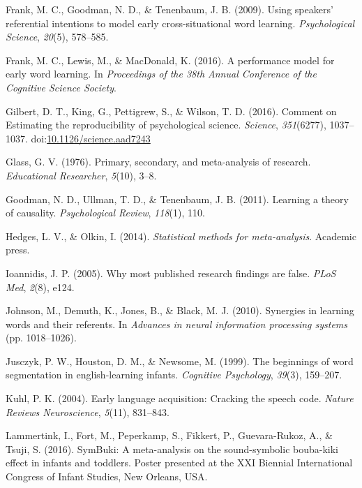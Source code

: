 \documentclass[english,floatsintext,man]{apa6}
\begin{document}
\hypertarget{ref-frank2009using}{}
Frank, M. C., Goodman, N. D., \& Tenenbaum, J. B. (2009). Using
speakers' referential intentions to model early cross-situational word
learning. \emph{Psychological Science}, \emph{20}(5), 578--585.

\hypertarget{ref-frank2016performance}{}
Frank, M. C., Lewis, M., \& MacDonald, K. (2016). A performance model
for early word learning. In \emph{Proceedings of the 38th Annual
Conference of the Cognitive Science Society}.

\hypertarget{ref-Gilbert1037}{}
Gilbert, D. T., King, G., Pettigrew, S., \& Wilson, T. D. (2016).
Comment on Estimating the reproducibility of psychological science.
\emph{Science}, \emph{351}(6277), 1037--1037.
doi:\href{https://doi.org/10.1126/science.aad7243}{10.1126/science.aad7243}

\hypertarget{ref-glass1976primary}{}
Glass, G. V. (1976). Primary, secondary, and meta-analysis of research.
\emph{Educational Researcher}, \emph{5}(10), 3--8.

\hypertarget{ref-goodman2011learning}{}
Goodman, N. D., Ullman, T. D., \& Tenenbaum, J. B. (2011). Learning a
theory of causality. \emph{Psychological Review}, \emph{118}(1), 110.

\hypertarget{ref-hedges2014statistical}{}
Hedges, L. V., \& Olkin, I. (2014). \emph{Statistical methods for
meta-analysis}. Academic press.

\hypertarget{ref-ioannidis2005most}{}
Ioannidis, J. P. (2005). Why most published research findings are false.
\emph{PLoS Med}, \emph{2}(8), e124.

\hypertarget{ref-johnson2010synergies}{}
Johnson, M., Demuth, K., Jones, B., \& Black, M. J. (2010). Synergies in
learning words and their referents. In \emph{Advances in neural
information processing systems} (pp. 1018--1026).

\hypertarget{ref-jusczyk1999beginnings}{}
Jusczyk, P. W., Houston, D. M., \& Newsome, M. (1999). The beginnings of
word segmentation in english-learning infants. \emph{Cognitive
Psychology}, \emph{39}(3), 159--207.

\hypertarget{ref-kuhl2004early}{}
Kuhl, P. K. (2004). Early language acquisition: Cracking the speech
code. \emph{Nature Reviews Neuroscience}, \emph{5}(11), 831--843.

\hypertarget{ref-lammertink2016}{}
Lammertink, I., Fort, M., Peperkamp, S., Fikkert, P., Guevara-Rukoz, A.,
\& Tsuji, S. (2016). SymBuki: A meta-analysis on the sound-symbolic
bouba-kiki effect in infants and toddlers. Poster presented at the XXI
Biennial International Congress of Infant Studies, New Orleans, USA.
\end{document}
